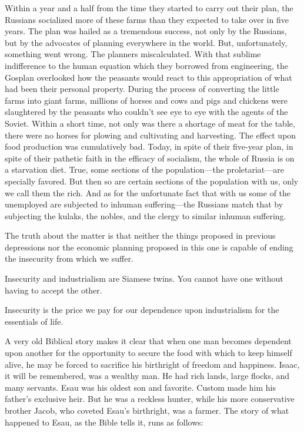 \documentclass{book}
\begin{document}
Within a year and a half from the time they started to carry out their plan, the Russians socialized more of these farms than they expected to take over in five years. The plan was hailed as a tremendous success, not only by the Russians, but by the advocates of planning everywhere in the world. But, unfortunately, something went wrong. The planners miscalculated. With that sublime indifference to the human equation which they borrowed from engineering, the Gosplan overlooked how the peasants would react to this appropriation of what had been their personal property. During the process of converting the little farms into giant farms, millions of horses and cows and pigs and chickens were slaughtered by the peasants who couldn’t see eye to eye with the agents of the Soviet. Within a short time, not only was there a shortage of meat for the table, there were no horses for plowing and cultivating and harvesting. The effect upon food production was cumulatively bad. Today, in spite of their five-year plan, in spite of their pathetic faith in the efficacy of socialism, the whole of Russia is on a starvation diet. True, some sections of the population—the proletariat—are specially favored. But then so are certain sections of the population with us, only we call them the rich. And as for the unfortunate fact that with us some of the unemployed are subjected to inhuman suffering—the Russians match that by subjecting the kulaks, the nobles, and the clergy to similar inhuman suffering.

The truth about the matter is that neither the things proposed in previous depressions nor the economic planning proposed in this one is capable of ending the insecurity from which we suffer.

Insecurity and industrialism are Siamese twins. You cannot have one without having to accept the other.

Insecurity is the price we pay for our dependence upon industrialism for the essentials of life.

A very old Biblical story makes it clear that when one man becomes dependent upon another for the opportunity to secure the food with which to keep himself alive, he may be forced to sacrifice his birthright of freedom and happiness. Isaac, it will be remembered, was a wealthy man. He had rich lands, large flocks, and many servants. Esau was his oldest son and favorite. Custom made him his father’s exclusive heir. But he was a reckless hunter, while his more conservative brother Jacob, who coveted Esau’s birthright, was a farmer. The story of what happened to Esau, as the Bible tells it, runs as follows:
\end{document}
